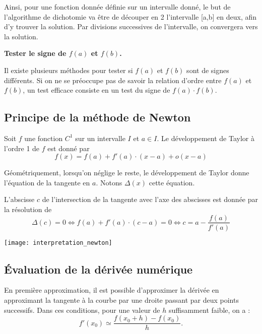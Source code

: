 Ainsi, pour une fonction donnée définie sur un intervalle donné, le but de l'algorithme de dichotomie va être de découper en 2 l'intervalle [a,b] en deux, afin d'y trouver la solution. Par divisions successives de l'intervalle, on convergera vers la solution.


\begin{remarque}
\textbf{Tester le signe de $f(a)$ et $f(b)$.}

Il existe plusieurs méthodes pour tester si $f(a)$ et $f(b)$ sont de signes différents. Si on ne se préoccupe pas de savoir la relation d'ordre entre $f(a)$ et $f(b)$, un test efficace consiste en un test du signe de $f(a)\cdot f(b)$. 
\end{remarque}




\subsection{Principe de la méthode de Newton}
\begin{defi}

Soit $f$ une fonction $C^1$ sur un intervalle $I$ et $a\in I$. Le développement de Taylor à l'ordre 1 de $f$ est donné par 
$$
f(x)=f(a)+ f'(a)\cdot(x-a)+\mathit{o}(x-a)
$$
\end{defi}



Géométriquement, lorsqu'on néglige le reste, le développement de Taylor donne l'équation de la tangente en $a$. Notons $\Delta(x)$ cette équation.

L'abscisse $c$ de l'intersection de la tangente avec l'axe des abscisses est donnée par la résolution de 
$$
\Delta(c)=0 
\Longleftrightarrow f(a)+ f'(a)\cdot(c-a) = 0
\Longleftrightarrow c = a-\dfrac{f(a)}{f'(a)}
$$


\begin{marginfigure}
\texttt{[image: interpretation\_newton]}
\end{marginfigure}


\subsection*{Évaluation de la dérivée numérique}

\begin{resultat}
En première approximation, il est possible d'approximer la dérivée en approximant la tangente à la courbe par une droite passant par deux points successifs. Dans ces conditions, pour une valeur de $h$ suffisamment faible, on a : 
$$
f'(x_0)\simeq \dfrac{f(x_0+h)-f(x_0)}{h}.
$$
\end{resultat}


